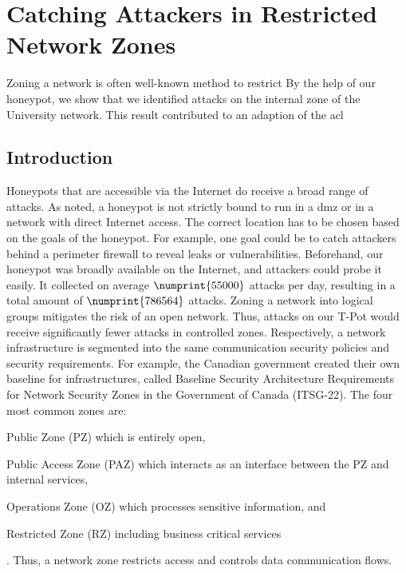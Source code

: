 \chapter{Catching Attackers in Restricted Network Zones}
\label{chap:concept}

Zoning a network is often well-known method to restrict 
By the help of our honeypot, we show that we identified attacks on the internal zone of the University network.
This result contributed to an adaption of the \ac{acl}

\section{Introduction}

Honeypots that are accessible via the Internet do receive a broad range of attacks.
As \citet{Spitzner2003} noted, a honeypot is not strictly bound to run in a \ac{dmz} or in a network with direct Internet access.
The correct location has to be chosen based on the goals of the honeypot.
For example, one goal could be to catch attackers behind a perimeter firewall to reveal leaks or vulnerabilities.
Beforehand, our honeypot was broadly available on the Internet, and attackers could probe it easily.
It collected on average $\numprint{55000}$ attacks per day, resulting in a total amount of $\numprint{786564}$ attacks.
Zoning a network into logical groups mitigates the risk of an open network.
Thus, attacks on our T-Pot would receive significantly fewer attacks in controlled zones.
Respectively, a network infrastructure is segmented into the same communication security policies and security requirements.
For example, the Canadian government created their own baseline for infrastructures, called Baseline Security Architecture Requirements for Network Security Zones in the Government of Canada (ITSG-22).
The four most common zones are:
\begin{enumerate*}[label=(\roman*)]
    \item Public Zone (PZ) which is entirely open,
    \item Public Access Zone (PAZ) which interacts as an interface between the PZ and internal services,
    \item Operations Zone (OZ) which processes sensitive information, and
    \item Restricted Zone (RZ) including business critical services
\end{enumerate*}.
Thus, a network zone restricts access and controls data communication flows. \cite{csec2021}
